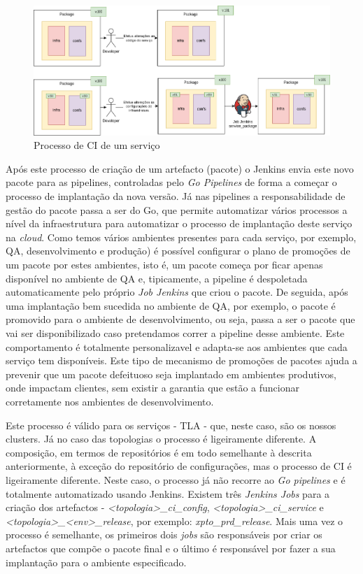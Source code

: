\begin{figure}[H]
  \centerline{\includegraphics[scale=0.5]{media/content/impl/ci-process.png}}
  \caption{Processo de \ac{CI} de um serviço}
  \label{ci-process}
\end{figure}


Após este processo de criação de um artefacto (pacote) o Jenkins envia este novo pacote para as
\glspl{pipeline}, controladas pelo \textit{Go Pipelines} de forma a começar o processo de 
implantação da nova versão. Já nas \glspl{pipeline} a responsabilidade de gestão do pacote passa a 
ser do Go, que permite automatizar vários processos a nível da infraestrutura para automatizar o 
processo de implantação deste serviço na \textit{cloud}. Como temos vários ambientes presentes para 
cada serviço, por exemplo, \ac{QA}, desenvolvimento e produção) é possível configurar o plano de 
promoções de um pacote por estes ambientes, isto é, um pacote começa por ficar apenas disponível no 
ambiente de QA e, tipicamente, a \gls{pipeline} é despoletada automaticamente pelo próprio 
\textit{Job Jenkins} que criou o pacote. De seguida, após uma implantação bem sucedida no ambiente 
de QA, por exemplo, o pacote é promovido para o ambiente de desenvolvimento, ou seja, passa a ser 
o pacote que vai ser disponibilizado caso pretendamos correr a \gls{pipeline} desse ambiente. 
Este comportamento é totalmente personalizavel e adapta-se aos ambientes que cada serviço tem 
disponíveis. Este tipo de mecanismo de promoções de pacotes ajuda a prevenir que um pacote 
defeituoso seja implantado em ambientes produtivos, onde impactam clientes, sem existir a garantia 
que estão a funcionar corretamente nos ambientes de desenvolvimento.

Este processo é válido para os serviços - \ac{TLA} - que, neste caso, são os nossos \glspl{cluster}.
Já no caso das topologias o processo é ligeiramente diferente. A composição, em termos de 
repositórios é em todo semelhante à descrita anteriormente, à exceção do repositório de configurações,
mas o processo de \ac{CI} é ligeiramente diferente. Neste caso, o processo já não recorre ao 
\textit{Go pipelines} e é totalmente automatizado usando Jenkins. Existem três \textit{Jenkins Jobs} 
para a criação dos artefactos - \textit{<topologia>\_ci\_config}, \textit{<topologia>\_ci\_service}
e \textit{<topologia>\_<env>\_release}, por exemplo: \textit{xpto\_prd\_release}. Mais uma vez o 
processo é semelhante, os primeiros dois \textit{jobs} são responsáveis por criar os artefactos 
que compõe o pacote final e o último é responsável por fazer a sua implantação para o ambiente 
especificado.

